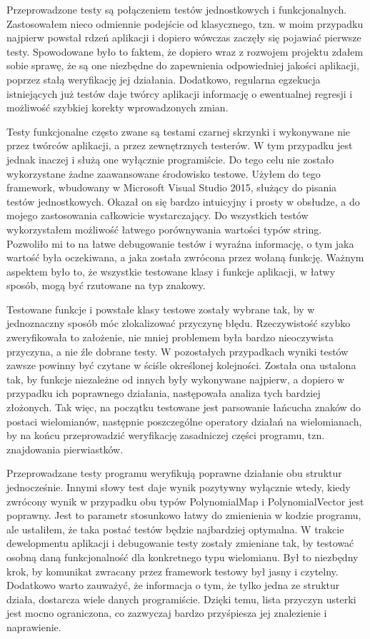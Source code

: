 \documentclass[oneside,a4paper]{book}
\begin{document}
	Przeprowadzone testy są połączeniem testów jednostkowych i funkcjonalnych. Zastosowałem nieco odmiennie podejście od klasycznego, tzn. w moim przypadku najpierw powstał rdzeń aplikacji i dopiero wówczas zaczęły się pojawiać pierwsze testy. Spowodowane było to faktem, że dopiero wraz z rozwojem projektu zdałem sobie sprawę, że są one niezbędne do zapewnienia odpowiedniej jakości aplikacji, poprzez stałą weryfikację jej działania. Dodatkowo, regularna egzekucja istniejących już testów daje twórcy aplikacji informację o ewentualnej regresji i możliwość szybkiej korekty wprowadzonych zmian.
	
	Testy funkcjonalne często zwane są testami czarnej skrzynki i wykonywane nie przez twórców aplikacji, a przez zewnętrznych testerów. W tym przypadku jest jednak inaczej i służą one wyłącznie programiście. Do tego celu nie zostało wykorzystane żadne zaawansowane środowisko testowe. Użyłem do tego framework, wbudowany w Microsoft Visual Studio 2015, służący do pisania testów jednostkowych. Okazał on się bardzo intuicyjny i prosty w obsłudze, a do mojego zastosowania całkowicie wystarczający. Do wszystkich testów wykorzystałem możliwość łatwego porównywania wartości typów string. Pozwoliło mi to na łatwe debugowanie testów i wyraźna informację, o tym jaka wartość była oczekiwana, a jaka została zwrócona przez wołaną funkcję. Ważnym aspektem było to, że wszystkie testowane klasy i funkcje aplikacji, w łatwy sposób, mogą być rzutowane na typ znakowy.
	
	Testowane funkcje i powstałe klasy testowe zostały wybrane tak, by w jednoznaczny sposób móc zlokalizować przyczynę błędu. Rzeczywistość szybko zweryfikowała to założenie, nie mniej problemem była bardzo nieoczywista przyczyna, a nie źle dobrane testy. W pozostałych przypadkach wyniki testów zawsze powinny być czytane w ściśle określonej kolejności. Została ona ustalona tak, by funkcje niezależne od innych były wykonywane najpierw, a dopiero w przypadku ich poprawnego działania, następowała analiza tych bardziej złożonych. Tak więc, na początku testowane jest parsowanie łańcucha znaków do postaci wielomianów, następnie poszczególne operatory działań na wielomianach, by na końcu przeprowadzić weryfikację zasadniczej części programu, tzn. znajdowania pierwiastków.
	
	Przeprowadzane testy programu weryfikują poprawne działanie obu struktur jednocześnie. Innymi słowy test daje wynik pozytywny wyłącznie wtedy, kiedy zwrócony wynik w przypadku obu typów PolynomialMap i PolynomialVector jest poprawny. Jest to parametr stosunkowo łatwy do zmienienia w kodzie programu, ale ustaliłem, że taka postać testów będzie najbardziej optymalna. W trakcie dewelopmentu aplikacji i debugowanie testy zostały zmieniane tak, by testować osobną daną funkcjonalność dla konkretnego typu wielomianu. Był to niezbędny krok, by komunikat zwracany przez framework testowy był jasny i czytelny. Dodatkowo warto zauważyć, że informacja o tym, że tylko jedna ze struktur działa, dostarcza wiele danych programiście. Dzięki temu, lista przyczyn usterki jest mocno ograniczona, co zazwyczaj bardzo przyśpiesza jej znalezienie i naprawienie.
	
\end{document}
